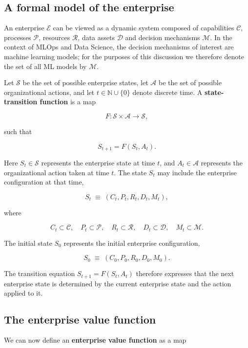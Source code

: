 \documentclass[
  a4paper,
  DIV=11,
  numbers=noendperiod]{scrartcl}
\begin{document}
\subsection{A formal model of the
enterprise}\label{a-formal-model-of-the-enterprise}

An enterprise \(\mathcal{E}\) can be viewed as a dynamic system composed
of capabilities \(\mathcal{C}\), processes \(\mathcal{P}\), resources
\(\mathcal{R}\), data assets \(\mathcal{D}\) and decision mechanisms
\(\mathcal{M}\). In the context of MLOps and Data Science, the decision
mechanisms of interest are machine learning models; for the purposes of
this discussion we therefore denote the set of all ML models by
\(\mathcal{M}\).

Let \(\mathcal{S}\) be the set of possible enterprise states, let
\(\mathcal{A}\) be the set of possible organizational actions, and let
\(t \in \mathbb{N} \cup \{0\}\) denote discrete time. A
\textbf{state-transition function} is a map

\[
F \colon \mathcal{S} \times \mathcal{A} \rightarrow \mathcal{S},
\]

such that

\[
S_{t+1} = F(S_t, A_t).
\]

Here \(S_t \in \mathcal{S}\) represents the enterprise state at time
\(t\), and \(A_t \in \mathcal{A}\) represents the organizational action
taken at time \(t\). The state \(S_t\) may include the enterprise
configuration at that time,

\[
S_t \;\equiv\; (C_t, P_t, R_t, D_t, M_t),
\]

where

\[
C_t \subset \mathcal{C}, \quad
P_t \subset \mathcal{P}, \quad
R_t \subset \mathcal{R}, \quad
D_t \subset \mathcal{D}, \quad
M_t \subset \mathcal{M}.
\]

The initial state \(S_0\) represents the initial enterprise
configuration,

\[
S_0 \;\equiv\; (C_0, P_0, R_0, D_0, M_0).
\]

The transition equation \(S_{t+1} = F(S_t, A_t)\) therefore expresses
that the next enterprise state is determined by the current enterprise
state and the action applied to it.

\subsection{The enterprise value
function}\label{the-enterprise-value-function}

We can now define an \textbf{enterprise value function} as a map
\end{document}

